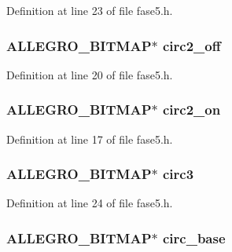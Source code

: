 Definition at line 23 of file fase5.\-h.

\hypertarget{struct_level_cinco_a384448f3d672f70b70b1bf454cb46e50}{
\subsubsection[{circ2\-\_\-off}]{\setlength{\rightskip}{0pt plus 5cm}A\-L\-L\-E\-G\-R\-O\-\_\-\-B\-I\-T\-M\-A\-P$\ast$ circ2\-\_\-off}}\label{struct_level_cinco_a384448f3d672f70b70b1bf454cb46e50}


Definition at line 20 of file fase5.\-h.

\hypertarget{struct_level_cinco_aa582b8f9acdbb85a2d1d54705e26fa15}{
\subsubsection[{circ2\-\_\-on}]{\setlength{\rightskip}{0pt plus 5cm}A\-L\-L\-E\-G\-R\-O\-\_\-\-B\-I\-T\-M\-A\-P$\ast$ circ2\-\_\-on}}\label{struct_level_cinco_aa582b8f9acdbb85a2d1d54705e26fa15}


Definition at line 17 of file fase5.\-h.

\hypertarget{struct_level_cinco_aaa21201ceebf455212233414bd6eedbc}{
\subsubsection[{circ3}]{\setlength{\rightskip}{0pt plus 5cm}A\-L\-L\-E\-G\-R\-O\-\_\-\-B\-I\-T\-M\-A\-P$\ast$ circ3}}\label{struct_level_cinco_aaa21201ceebf455212233414bd6eedbc}


Definition at line 24 of file fase5.\-h.

\hypertarget{struct_level_cinco_aee8957702842b3d636f0a1075b6e52e2}{
\subsubsection[{circ\-\_\-base}]{\setlength{\rightskip}{0pt plus 5cm}A\-L\-L\-E\-G\-R\-O\-\_\-\-B\-I\-T\-M\-A\-P$\ast$ circ\-\_\-base}}\label{struct_level_cinco_aee8957702842b3d636f0a1075b6e52e2}


